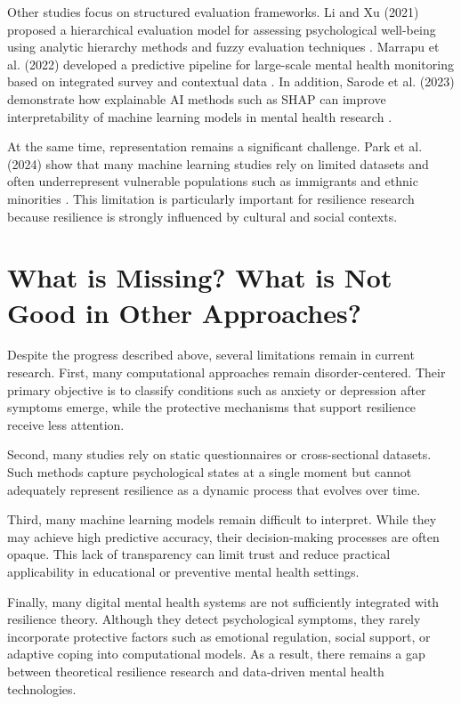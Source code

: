 \documentclass[conference]{IEEEtran}
\begin{document}
Other studies focus on structured evaluation frameworks. Li and Xu (2021) proposed a hierarchical evaluation model for assessing psychological well-being using analytic hierarchy methods and fuzzy evaluation techniques \cite{Li2021}. Marrapu et al. (2022) developed a predictive pipeline for large-scale mental health monitoring based on integrated survey and contextual data \cite{Marrapu2022}. In addition, Sarode et al. (2023) demonstrate how explainable AI methods such as SHAP can improve interpretability of machine learning models in mental health research \cite{Sarode2025}.

At the same time, representation remains a significant challenge. Park et al. (2024) show that many machine learning studies rely on limited datasets and often underrepresent vulnerable populations such as immigrants and ethnic minorities \cite{KhatriPark}. This limitation is particularly important for resilience research because resilience is strongly influenced by cultural and social contexts.

\section{What is Missing? What is Not Good in Other Approaches?}

Despite the progress described above, several limitations remain in current research. First, many computational approaches remain disorder-centered. Their primary objective is to classify conditions such as anxiety or depression after symptoms emerge, while the protective mechanisms that support resilience receive less attention.

Second, many studies rely on static questionnaires or cross-sectional datasets. Such methods capture psychological states at a single moment but cannot adequately represent resilience as a dynamic process that evolves over time.

Third, many machine learning models remain difficult to interpret. While they may achieve high predictive accuracy, their decision-making processes are often opaque. This lack of transparency can limit trust and reduce practical applicability in educational or preventive mental health settings.

Finally, many digital mental health systems are not sufficiently integrated with resilience theory. Although they detect psychological symptoms, they rarely incorporate protective factors such as emotional regulation, social support, or adaptive coping into computational models. As a result, there remains a gap between theoretical resilience research and data-driven mental health technologies.
\end{document}
